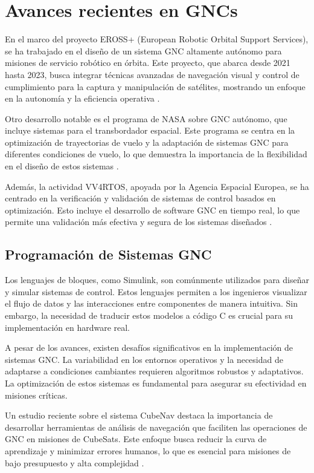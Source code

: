 \section{Avances recientes en GNCs }

En el marco del proyecto EROSS+ (European Robotic Orbital Support Services), se ha trabajado en el diseño de un sistema GNC altamente autónomo 
para misiones de servicio robótico en órbita. Este proyecto, que abarca desde 2021 hasta 2023, busca integrar técnicas avanzadas de navegación 
visual y control de cumplimiento para la captura y manipulación de satélites, mostrando un enfoque en la autonomía y la eficiencia operativa \cite{Casu2023EROSSPA}.

Otro desarrollo notable es el programa de NASA sobre GNC autónomo, que incluye sistemas para el transbordador espacial. Este programa se centra en la optimización 
de trayectorias de vuelo y la adaptación de sistemas GNC para diferentes condiciones de vuelo, lo que demuestra la importancia de la flexibilidad en el diseño de 
estos sistemas \cite{Bordano1991AutonomousGN}.

Además, la actividad VV4RTOS, apoyada por la Agencia Espacial Europea, se ha centrado en la verificación y validación de sistemas de control basados en optimización. 
Esto incluye el desarrollo de software GNC en tiempo real, lo que permite una validación más efectiva y segura de los sistemas diseñados \cite{Loureno2023VerificationV}.

\subsection{Programación de Sistemas GNC}
Los lenguajes de bloques, como Simulink, son comúnmente utilizados para diseñar y simular sistemas de control. Estos lenguajes permiten a los ingenieros visualizar 
el flujo de datos y las interacciones entre componentes de manera intuitiva. Sin embargo, la necesidad de traducir estos modelos a código C es crucial para su 
implementación en hardware real.

A pesar de los avances, existen desafíos significativos en la implementación de sistemas GNC. La variabilidad en los entornos operativos y la necesidad de adaptarse 
a condiciones cambiantes requieren algoritmos robustos y adaptativos. La optimización de estos sistemas es fundamental para asegurar su efectividad en misiones 
críticas.

Un estudio reciente sobre el sistema CubeNav destaca la importancia de desarrollar herramientas de análisis de navegación que faciliten las operaciones de GNC 
en misiones de CubeSats. Este enfoque busca reducir la curva de aprendizaje y minimizar errores humanos, lo que es esencial para misiones de bajo presupuesto 
y alta complejidad \cite{Loureno2023VerificationV}.